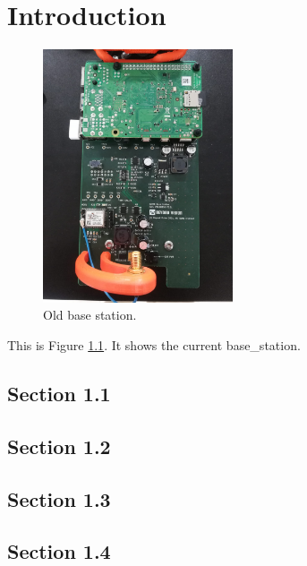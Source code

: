 




\chapter{Introduction}\label{cha:introduction}

\begin{figure}[H]
  \centering
	\includegraphics[width=0.5\textwidth, keepaspectratio]{Chapters/Figures/Intro/old_BS.jpeg}
	\caption{Old base station.}
	\label{fig:old_BS}
\end{figure}

This is Figure \ref{fig:old_BS}. It shows the current \gls{base_station}.

\section{Section 1.1}\label{sub:sub1_1}

\section{Section 1.2}\label{sec:sub1_2}

\section{Section 1.3}\label{sec:sub1_3}

\section{Section 1.4}\label{sec:sub1_4}
